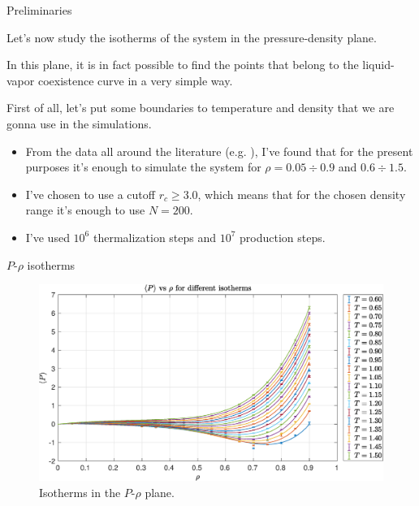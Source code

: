 \documentclass[10pt, compress, protectframetitle, handout]{beamer}
\begin{document}
\begin{frame}{Preliminaries}

	Let's now study the isotherms of the system in the pressure-density plane.
	
	In this plane, it is in fact possible to find the points that belong to the \alert{liquid-vapor coexistence curve} in a very simple way.
	
	First of all, let's put some boundaries to temperature and density that we are gonna use in the simulations.
	\begin{itemize}
		\item From the data all around the literature (e.g. \cite{Johnson1993}), I've found that for the present purposes it's enough to simulate the system for $\rho = 0.05 \div 0.9$ and $0.6 \div 1.5$.
		\item I've chosen to use a cutoff $r_c \geq 3.0$, which means that for the chosen density range it's enough to use $N=200$.
		\item I've used $10^6$ thermalization steps and $10^7$ production steps.
	\end{itemize}
	

\end{frame}

\begin{frame}{$P$-$\rho$ isotherms}

	\begin{figure}
		\centering
		\includegraphics[width=\textwidth]{PvsRho}
		\caption{Isotherms in the $P$-$\rho$ plane.}
		\label{fig:P_vs_Rho}
	\end{figure}

\end{frame}
\end{document}
